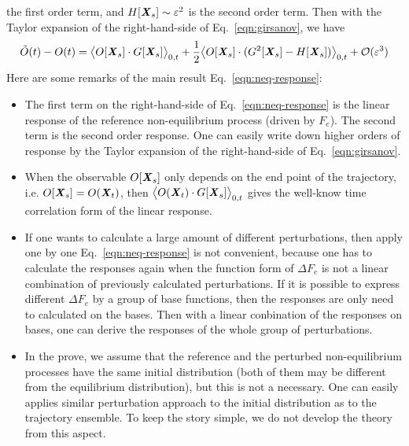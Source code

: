 \documentclass[aip,jcp,a4paper,reprint,onecolumn]{revtex4-1}
\newcommand{\vect}[1]{\textbf{\textit{#1}}}
\newcommand{\mo}{\mathcal O}
\begin{document}
the first order term, and $H[\vect X_s] \sim \varepsilon^2$  is the second order term.
Then with the Taylor expansion of the right-hand-side of Eq.~\eqref{eqn:girsanov}, we have
\begin{align}\label{eqn:neq-response}
  \tilde O(t) -
  O(t)
  =
  \big\langle O[\vect X_s]\cdot G[\vect X_s]\big\rangle_{0,t}
  +
  \frac12 \big\langle O[\vect X_s] \cdot (G^2[\vect X_s] - H[\vect X_s] )\big\rangle_{0,t}
  +
  \mo (\varepsilon^3)
\end{align}
Here are some remarks of the main result Eq.~\eqref{eqn:neq-response}:
\begin{itemize}
\item The first term on the right-hand-side of Eq.~\eqref{eqn:neq-response} is the linear
  response of the reference non-equilibrium process (driven by $F_e$). The second term is the second order
  response. One can easily write down higher orders of response by the Taylor expansion
  of the right-hand-side of Eq.~\eqref{eqn:girsanov}.
\item When the observable $O[\vect X_s]$ only depends on the end point of the trajectory, i.e.
  $O[\vect X_s] = O(\vect X_t)$, then $\big\langle O(\vect X_t)\cdot G[\vect X_s]\big\rangle_{0,t}$
  gives the well-know time correlation form of the linear response.
\item If one wants to calculate a large amount of different perturbations, then apply one by one
  Eq.~\eqref{eqn:neq-response} is not convenient, because one has to calculate the responses
  again when the function form of $\Delta F_e$ is not a linear combination of previously calculated perturbations.
  If it is possible to
  express different $\Delta F_e$ by a group of base functions, then the responses are only need
  to calculated on the bases. Then with a linear conbination of the responses on bases, one can derive
  the responses of the whole group of perturbations. 
\item In the prove, we assume that the reference and the perturbed non-equilibrium processes
  have the same initial distribution (both of them may be different from the equilibrium distribution),
  but this is not a necessary. One can easily
  applies similar perturbation approach to the initial distribution as  to the trajectory ensemble.
  To keep the story simple, we do not develop the theory from this aspect.
\end{itemize}
\end{document}
